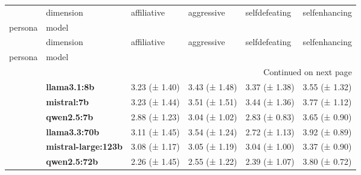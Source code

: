 \begin{longtable}{llllll}
\toprule
 & dimension & affiliative & aggressive & selfdefeating & selfenhancing \\
persona & model &  &  &  &  \\
\midrule
\endfirsthead
\toprule
 & dimension & affiliative & aggressive & selfdefeating & selfenhancing \\
persona & model &  &  &  &  \\
\midrule
\endhead
\midrule
\multicolumn{6}{r}{Continued on next page} \\
\midrule
\endfoot
\bottomrule
\endlastfoot
\multirow[t]{6}{*}{\textbf{base}} & \textbf{llama3.1:8b} & 3.23 (± 1.40) & 3.43 (± 1.48) & 3.37 (± 1.38) & 3.55 (± 1.32) \\
\textbf{} & \textbf{mistral:7b} & 3.23 (± 1.44) & 3.51 (± 1.51) & 3.44 (± 1.36) & 3.77 (± 1.12) \\
\textbf{} & \textbf{qwen2.5:7b} & 2.88 (± 1.23) & 3.04 (± 1.02) & 2.83 (± 0.83) & 3.65 (± 0.90) \\
\textbf{} & \textbf{llama3.3:70b} & 3.11 (± 1.45) & 3.54 (± 1.24) & 2.72 (± 1.13) & 3.92 (± 0.89) \\
\textbf{} & \textbf{mistral-large:123b} & 3.08 (± 1.17) & 3.05 (± 1.19) & 3.04 (± 1.00) & 3.37 (± 0.90) \\
\textbf{} & \textbf{qwen2.5:72b} & 2.26 (± 1.45) & 2.55 (± 1.22) & 2.39 (± 1.07) & 3.80 (± 0.72) \\
\cline{1-6}
\end{longtable}
